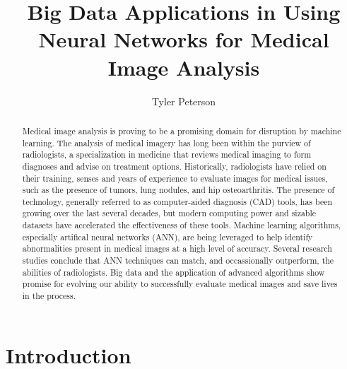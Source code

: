 \documentclass[sigconf]{acmart}
\begin{document}
\title{Big Data Applications in Using Neural Networks for Medical Image Analysis}


\author{Tyler Peterson}


\renewcommand{\shortauthors}{G. v. Laszewski}


\begin{abstract}

  Medical image analysis is proving to be a promising domain for disruption by machine learning. The analysis of medical imagery has long been within the purview of radiologists, a specialization in medicine that reviews medical imaging to form diagnoses and advise on treatment options. Historically, radiologists have relied on their training, senses and years of experience to evaluate images for medical issues, such as the presence of tumors, lung nodules, and hip osteoarthritis. The presence of technology, generally referred to as computer-aided diagnosis (CAD) tools, has been growing over the last several decades, but modern computing power and sizable datasets have accelerated the effectiveness of these tools. Machine learning algorithms, especially artifical neural networks (ANN), are being leveraged to help identify abnormalities present in medical images at a high level of accuracy. Several research studies conclude that ANN techniques can match, and occassionally outperform, the abilities of radiologists. Big data and the application of advanced algorithms show promise for evolving our ability to successfully evaluate medical images and save lives in the process.

\end{abstract}




\maketitle


\section{Introduction}
\end{document}
